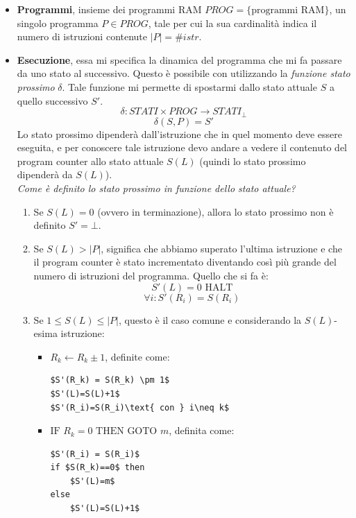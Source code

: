 \documentclass{article}
\begin{document}
\begin{itemize}
    \item \textbf{Programmi}, insieme dei programmi RAM $PROG=\{\text{programmi RAM}\}$, un
          singolo programma $P\in PROG$, tale per cui la sua cardinalità indica
          il numero di istruzioni contenute $|P| = \#istr$.
    \item \textbf{Esecuzione}, essa mi specifica la dinamica del programma che mi fa
          passare da uno stato al successivo. Questo è possibile con utilizzando la \textit{funzione
              stato prossimo} $\delta$. Tale funzione mi permette di spostarmi dallo stato attuale
          $S$ a quello successivo $S'$.
          $$\delta:STATI\times PROG \rightarrow STATI_\bot$$
          $$\delta(S,P)=S'$$
          Lo stato prossimo dipenderà dall'istruzione che in quel momento deve essere eseguita,
          e per conoscere tale istruzione devo andare a vedere il contenuto del program counter
          allo stato attuale $S(L)$ (quindi lo stato prossimo dipenderà da $S(L)$).\\\textit{Come
              è definito lo stato prossimo in funzione dello stato attuale?}
          \begin{enumerate}
              \item Se $S(L)=0$ (ovvero in terminazione), allora lo stato prossimo non è definito
                    $S'=\bot$.
              \item Se $S(L)>|P|$, significa che abbiamo superato l'ultima istruzione
                    e che il program counter è stato incrementato diventando così più
                    grande del numero di istruzioni del programma. Quello che si fa è:
                    $$S'(L)=0\text{ HALT}$$
                    $$\forall i:S'(R_i)=S(R_i)$$
              \item Se $1\leq S(L)\leq |P|$, questo è il caso comune e considerando
                    la $S(L)$-esima istruzione:
                    \begin{itemize}
                        \item $R_k\leftarrow R_k \pm 1$, definite come:
                              \begin{lstlisting}[mathescape=true]
$S'(R_k) = S(R_k) \pm 1$
$S'(L)=S(L)+1$
$S'(R_i)=S(R_i)\text{ con } i\neq k$
                        \end{lstlisting}
                        \item $\text{IF }R_k=0\text{ THEN GOTO }m$, definita come:
                              \begin{lstlisting}[mathescape]
$S'(R_i) = S(R_i)$
if $S(R_k)==0$ then
    $S'(L)=m$
else
    $S'(L)=S(L)+1$
                        \end{lstlisting}
                    \end{itemize}
          \end{enumerate}

\end{itemize}
\end{document}
